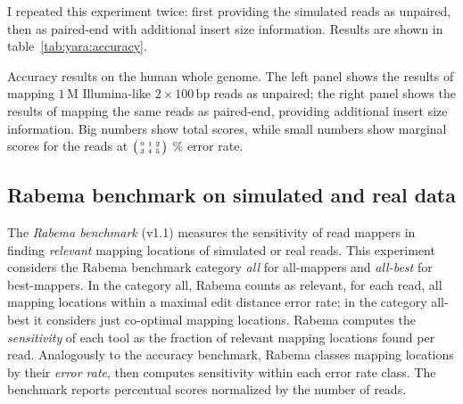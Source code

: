 I repeated this experiment twice: first providing the simulated reads as unpaired, then as paired-end with additional insert size information.
Results are shown in table~\ref{tab:yara:accuracy}.



\begin{table*}[t]
  \caption[Yara accuracy results]
  {
  \label{tab:yara:accuracy}
    Accuracy results on the human whole genome.
    The left panel shows the results of mapping $1\,\text{M}$ Illumina-like $2 \times 100\,\text{bp}$ reads as unpaired; the right panel shows the results of mapping the same reads as paired-end, providing additional insert size information.
    Big numbers show total scores, while small numbers show marginal scores for the reads at $\bigl(\begin{smallmatrix}\mbox{\tiny 0}&\mbox{\tiny 1}&\mbox{\tiny 2}\\\mbox{\tiny 3}&\mbox{\tiny 4}&\mbox{\tiny 5}\end{smallmatrix}\bigr)$ \% error rate.
    }
  \vspace{-3mm}
  \center
  \sffamily
  \resizebox{0.95\textwidth}{!}
  {
	\renewcommand{\tabcolsep}{0.8ex}
	
  }
\end{table*}


\subsection{Rabema benchmark on simulated and real data}

The \emph{Rabema benchmark} \citep{Holtgrewe2011} (v1.1) measures the sensitivity of read mappers in finding \emph{relevant} mapping locations of simulated or real reads.
This experiment considers the Rabema benchmark category \emph{all} for all-mappers and \emph{all-best} for best-mappers.
In the category all, Rabema counts as relevant, for each read, all mapping locations within a maximal edit distance error rate; in the category all-best it considers just co-optimal mapping locations.
Rabema computes the \emph{sensitivity} of each tool as the fraction of relevant mapping locations found per read.
Analogously to the accuracy benchmark, Rabema classes mapping locations by their \emph{error rate}, then computes sensitivity within each error rate class.
The benchmark reports percentual scores normalized by the number of reads.

